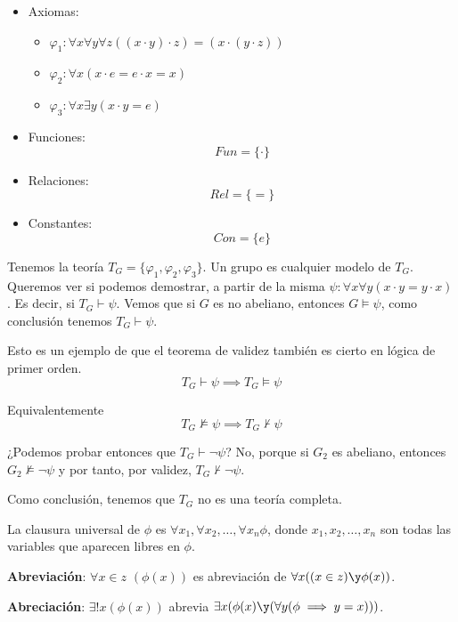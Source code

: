 \begin{example}\mbox{}

\begin{itemize}

	\item Axiomas:
	\begin{itemize}
		\vspace{-3mm}
		\item $\varphi_1: \forall x\forall y\forall z ((x\cdot y)\cdot z) = (x\cdot(y\cdot z))$
		\item $\varphi_2: \forall x(x\cdot e = e\cdot x = x)$
		\item $\varphi_3: \forall x\exists y (x\cdot y = e)$
	\end{itemize}

	\item Funciones:
	$$Fun = \{\cdot\}$$
	
	\item Relaciones:
	$$Rel = \{=\}$$
	
	\item Constantes:
	$$Con = \{e\}$$
\end{itemize}

Tenemos la teoría $T_G = \{\varphi_1, \varphi_2, \varphi_3\}$. Un grupo es cualquier modelo de $T_G$. Queremos ver si podemos demostrar, a partir de la misma $\psi: \forall x\forall y(x\cdot y = y\cdot x)$. Es decir, si $T_G\vdash \psi$. Vemos que si $G$ es no abeliano, entonces $G\vDash \psi$, como conclusión tenemos $T_G\vdash \psi$.

Esto es un ejemplo de que el teorema de validez también es cierto en lógica de primer orden.
$$T_G\vdash \psi \implies T_G \vDash \psi$$

Equivalentemente
$$T_G\nvDash \psi \implies T_G \nvdash \psi$$

¿Podemos probar entonces que $T_G\vdash \neg \psi$? No, porque si $G_2$ es abeliano, entonces $G_2\nvDash \neg\psi$ y por tanto, por validez, $T_G\nvdash \neg \psi$.

Como conclusión, tenemos que $T_G$ no es una teoría completa.
\end{example}

\begin{defn}
	La clausura universal de $\phi$ es $\forall x_1, \forall x_2,\hdots, \forall x_n \phi$, donde $x_1, x_2, \hdots, x_n$ son todas las variables que aparecen libres en $\phi$.
	
	\textbf{Abreviación}: $\forall x\in z$ $(\phi(x))$ es abreviación de $\forall x ((x\in z) \y \phi (x))$.
	
	\textbf{Abreciación}: $\exists ! x(\phi (x))$ abrevia $\exists x(\phi (x) \y (\forall y (\phi \implies y = x)))$.
\end{defn}


